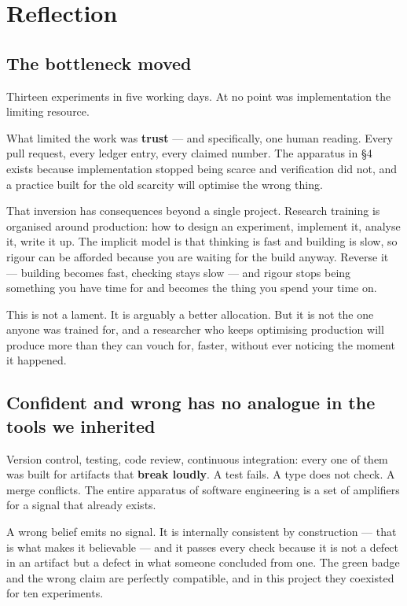 \section{Reflection}

\subsection{The bottleneck moved}

Thirteen experiments in five working days. At no point was implementation the limiting resource.

What limited the work was \textbf{trust} --- and specifically, one human reading. Every pull request, every ledger entry, every claimed number. The apparatus in \S4 exists because implementation stopped being scarce and verification did not, and a practice built for the old scarcity will optimise the wrong thing.

That inversion has consequences beyond a single project. Research training is organised around production: how to design an experiment, implement it, analyse it, write it up. The implicit model is that thinking is fast and building is slow, so rigour can be afforded because you are waiting for the build anyway. Reverse it --- building becomes fast, checking stays slow --- and rigour stops being something you have time for and becomes the thing you spend your time on.

This is not a lament. It is arguably a better allocation. But it is not the one anyone was trained for, and a researcher who keeps optimising production will produce more than they can vouch for, faster, without ever noticing the moment it happened.

\subsection{Confident and wrong has no analogue in the tools we inherited}

Version control, testing, code review, continuous integration: every one of them was built for artifacts that \textbf{break loudly}. A test fails. A type does not check. A merge conflicts. The entire apparatus of software engineering is a set of amplifiers for a signal that already exists.

A wrong belief emits no signal. It is internally consistent by construction --- that is what makes it believable --- and it passes every check because it is not a defect in an artifact but a defect in what someone concluded from one. The green badge and the wrong claim are perfectly compatible, and in this project they coexisted for ten experiments.

